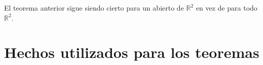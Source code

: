 	\begin{corolario}
		El teorema anterior sigue siendo cierto para un abierto de $\mathbb{R}^2$ en vez de para todo $\mathbb{R}^2$.
	\end{corolario}


\section{Hechos utilizados para los teoremas}

\endinput
